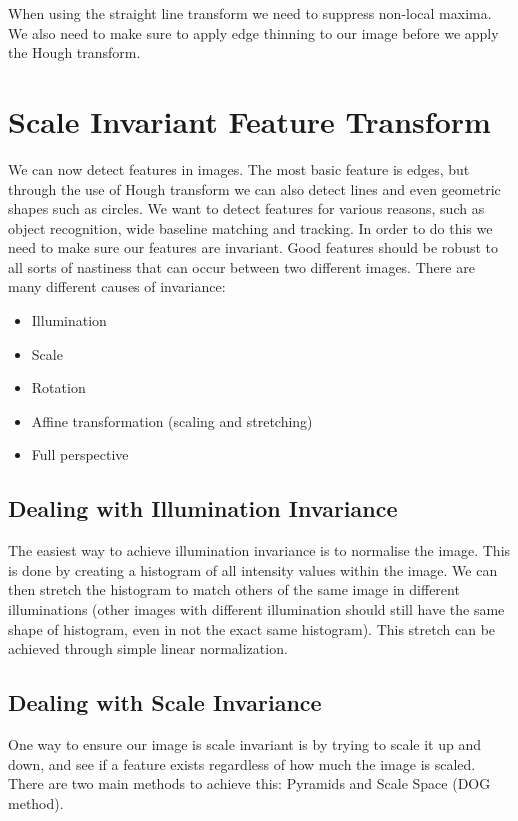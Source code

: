 \documentclass{article}
\begin{document}
	When using the straight line transform we need to suppress non-local maxima. We also need to make sure to apply edge thinning to our image before we apply the Hough transform.
	
	\section{Scale Invariant Feature Transform}
	We can now detect features in images. The most basic feature is edges, but through the use of Hough transform we can also detect lines and even geometric shapes such as circles. We want to detect features for various reasons, such as object recognition, wide baseline matching and tracking. In order to do this we need to make sure our features are invariant. Good features should be robust to all sorts of nastiness that can occur between two different images. There are many different causes of invariance:
	\begin{itemize}
		\item Illumination
		\item Scale
		\item Rotation
		\item Affine transformation (scaling and stretching)
		\item Full perspective
	\end{itemize}
	
	\subsection{Dealing with Illumination Invariance}
	The easiest way to achieve illumination invariance is to normalise the image. This is done by creating a histogram of all intensity values within the image. We can then stretch the histogram to match others of the same image in different illuminations (other images with different illumination should still have the same shape of histogram, even in not the exact same histogram). This stretch can be achieved through simple linear normalization.
	
	\subsection{Dealing with Scale Invariance}
	 One way to ensure our image is scale invariant is by trying to scale it up and down, and see if a feature exists regardless of how much the image is scaled. There are two main methods to achieve this: Pyramids and Scale Space (DOG method). 
	
\end{document}
